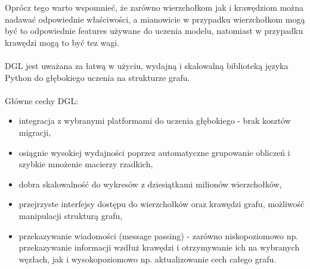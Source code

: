 \documentclass{article}
\begin{document}
Oprócz tego warto wspomnieć, że zarówno wierzchołkom jak i krawędziom można nadawać odpowiednie właściwości, a mianowicie w przypadku wierzchołkom mogą być to odpowiednie features używane do uczenia modelu, natomiast w przypadku krawędzi mogą to być tez wagi.

\paragraph{}
DGL jest uważana za łatwą w użyciu, wydajną i skalowalną biblioteką języka Python do głębokiego uczenia na strukturze grafu.
\paragraph{}
Główne cechy DGL:
\begin{itemize}
  \item
  integracja z wybranymi platformami do uczenia głębokiego - brak kosztów migracji, 
  \item 
  osiągnie wysokiej wydajności poprzez automatyczne grupowanie obliczeń i szybkie mnożenie macierzy rzadkich,
  \item 
  dobra skalowalność do wykresów z dziesiątkami milionów wierzchołków,
  \item 
  przejrzyste interfejsy dostępu do wierzchołków oraz krawędzi grafu, możliwość manipulacji strukturą grafu,
  \item 
  przekazywanie wiadomości (message passing) - zarówno niskopoziomowo np. przekazywanie informacji wzdłuż krawędzi i otrzymywanie ich na wybranych węzłach, jak i wysokopoziomowo np. aktualizowanie cech całego grafu.
  
 \end{itemize}
\end{document}
